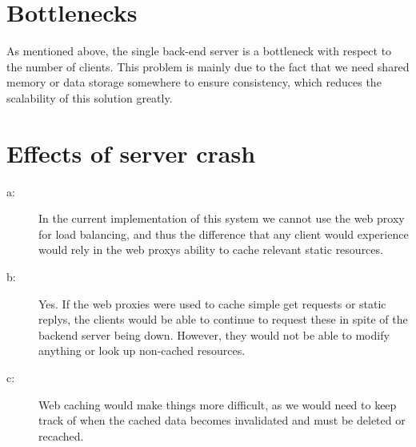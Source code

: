 \section{Bottlenecks}
As mentioned above, the single back-end server is a bottleneck with respect to the number of clients. This problem is mainly due to the fact that we need shared memory or data storage somewhere to ensure consistency, which reduces the scalability of this solution greatly.

\section{Effects of server crash}
\begin{description}
\item[a:] In the current implementation of this system we cannot use the web proxy for load balancing, and thus the difference that any client would experience would rely in the web proxys ability to cache relevant static resources.
\item[b:] Yes. If the web proxies were used to cache simple get requests or static replys, the clients would be able to continue to request these in spite of the backend server being down. However, they would not be able to modify anything or look up non-cached resources.
\item[c:] Web caching would make things more difficult, as we would need to keep track of when the cached data becomes invalidated and must be deleted or recached.
\end{description}